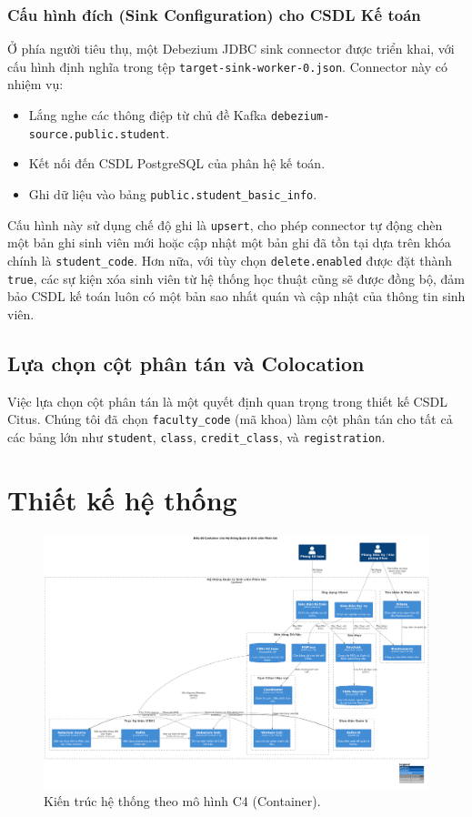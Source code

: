 \documentclass[conference]{IEEEtran}
\begin{document}
\subsubsection{Cấu hình đích (Sink Configuration) cho CSDL Kế toán}
Ở phía người tiêu thụ, một Debezium JDBC sink connector được triển khai, với cấu hình định nghĩa trong tệp \texttt{target-sink-worker-0.json}. Connector này có nhiệm vụ:
\begin{itemize}
    \item Lắng nghe các thông điệp từ chủ đề Kafka \texttt{debezium-source.public.student}.
    \item Kết nối đến CSDL PostgreSQL của phân hệ kế toán.
    \item Ghi dữ liệu vào bảng \texttt{public.student\_basic\_info}.
\end{itemize}
Cấu hình này sử dụng chế độ ghi là \texttt{upsert}, cho phép connector tự động chèn một bản ghi sinh viên mới hoặc cập nhật một bản ghi đã tồn tại dựa trên khóa chính là \texttt{student\_code}. Hơn nữa, với tùy chọn \texttt{delete.enabled} được đặt thành \texttt{true}, các sự kiện xóa sinh viên từ hệ thống học thuật cũng sẽ được đồng bộ, đảm bảo CSDL kế toán luôn có một bản sao nhất quán và cập nhật của thông tin sinh viên.

\subsection{Lựa chọn cột phân tán và Colocation}
Việc lựa chọn cột phân tán là một quyết định quan trọng trong thiết kế CSDL Citus. Chúng tôi đã chọn \texttt{faculty\_code} (mã khoa) làm cột phân tán cho tất cả các bảng lớn như \texttt{student}, \texttt{class}, \texttt{credit\_class}, và \texttt{registration}.

\section{Thiết kế hệ thống}

\begin{figure}[htbp]
\centering
\includegraphics[width=\columnwidth]{C4_Architecture.png}
\caption{Kiến trúc hệ thống theo mô hình C4 (Container).}
\label{fig:c4_diagram}
\end{figure}
\end{document}

